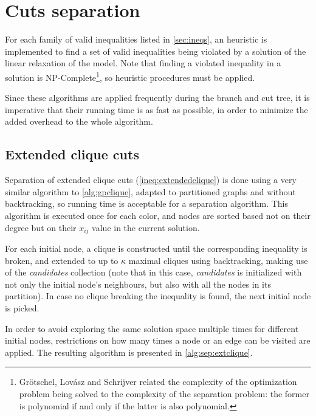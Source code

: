 \section{Cuts separation}

For each family of valid inequalities listed in \ref{sec:ineqs}, an heuristic is implemented to find a set of valid inequalities being violated by a solution of the linear relaxation of the model. Note that finding a violated inequality in a solution is NP-Complete\footnote{Gr\"{o}tschel, Lov\'{a}sz and Schrijver \cite{grotschel1981ellipsoid} related the complexity of the optimization problem being solved to the complexity of the separation problem: the former is polynomial if and only if the latter is also polynomial.}, so heuristic procedures must be applied. 

Since these algorithms are applied frequently during the branch and cut tree, it is imperative that their running time is as fast as possible, in order to minimize the added overhead to the whole algorithm.

\subsection{Extended clique cuts}

Separation of extended clique cuts (\ref{ineq:extendedclique}) is done using a very similar algorithm to \ref{alg:gpclique}, adapted to partitioned graphs and without backtracking, so running time is acceptable for a separation algorithm. This algorithm is executed once for each color, and nodes are sorted based not on their degree but on their $x_{ij}$ value in the current solution.

For each initial node, a clique is constructed until the corresponding inequality is broken, and extended to up to $\kappa$ maximal cliques using backtracking, making use of the \textit{candidates} collection (note that in this case, \textit{candidates} is initialized with not only the initial node's neighbours, but also with all the nodes in its partition). In case no clique breaking the inequality is found, the next initial node is picked.

In order to avoid exploring the same solution space multiple times for different initial nodes, restrictions on how many times a node or an edge can be visited are applied. The resulting algorithm is presented in \ref{alg:sep:extclique}.

